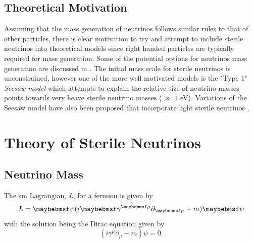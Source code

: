 \subsection{Theoretical Motivation}
Assuming that the mass generation of neutrinos follows similar rules to that of other particles, there is clear motivation to try and attempt to include sterile neutrinos into theoretical models since right handed particles are typically required for mass generation. Some of the potential options for neutrinos mass generation are discussed in . The initial mass scale for sterile neutrinos is unconstrained, however one of the more well motivated models is the "Type 1" \textit{Seesaw model} which attempts to explain the relative size of neutrino masses points towards very heave sterile neutrino masses ($\gg ~1$ eV). Variations of the Seesaw model have also been proposed that incorporate light sterile neutrinos \cite{White_Paper}.


\section{Theory of Sterile Neutrinos}\label{subchap:Theory of Sterile Neutrinos}
\subsection{Neutrino Mass}\label{subsec:Neutrino Mass}
The \gls{sm} Lagrangian, \textit{L}, for a fermion is given by
\begin{equation}\label{eqn:SM Lagrangian}
    L = \Bar{\psi}(i\gamma^{\mu} \partial_{\mu} - m)\psi
\end{equation}
with the solution being the Dirac equation given by \cite{Fundamentals_of_Neutrino_Physics_and_Astrophysics}
\begin{equation}
    (i\gamma^\mu\partial_\mu - m)\psi = 0.
\end{equation}
